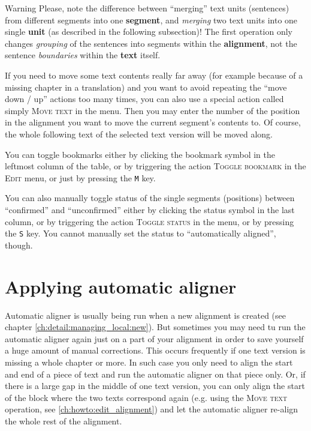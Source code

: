 \documentclass[a4paper,10pt,oneside]{book}
\newcommand{\keys}[1]{\texttt{#1}}
\newcommand{\menu}[1]{\textsc{#1}}
\begin{document}
\begin{bclogo}[couleur = blue!30, arrondi = 0.1, logo = \bcattention,
ombre = true , epOmbre = 0.125, couleurOmbre = black!30, blur, epBord = 0.3, marge = 5]{Warning}\small
Please, note the difference between ``merging'' text units (sentences) from different segments into one \textbf{segment}, and \emph{merging} two text units into one single \textbf{unit} (as described in the following subsection)! The first operation only changes \emph{grouping} of the sentences into segments within the \textbf{alignment}, not the sentence \emph{boundaries} within the \textbf{text} itself.
\end{bclogo}

If you need to move some text contents really far away (for example because of a missing chapter in a translation) and you want to avoid repeating the ``move down / up'' actions too many times, you can also use a special action called simply \menu{Move text} in the menu. Then you may enter the number of the position in the alignment you want to move the current segment's contents to. Of course, the whole following text of the selected text version will be moved along.

You can toggle bookmarks either by clicking the bookmark symbol in the leftmost column of the table, or by triggering the action \menu{Toggle bookmark} in the \menu{Edit} menu, or just by pressing the \keys{M} key.

You can also manually toggle status of the single segments (positions) between ``confirmed'' and ``unconfirmed'' either by clicking the status symbol in the last column, or by triggering the action \menu{Toggle status} in the menu, or by pressing the \keys{S} key. You cannot manually set the status to ``automatically aligned'', though.

\section{Applying automatic aligner}\label{ch:howto:autoalign}

Automatic aligner is usually being run when a new alignment is created (see chapter \ref{ch:detail:managing_local:new}). But sometimes you may need tu run the automatic aligner again just on a part of your alignment in order to save yourself a huge amount of manual corrections. This occurs frequently if one text version is missing a whole chapter or more. In such case you only need to align the start and end of a piece of text and run the automatic aligner on that piece only. Or, if there is a large gap in the middle of one text version, you can only align the start of the block where the two texts correspond again (e.g. using the \menu{Move text} operation, see \ref{ch:howto:edit_alignment}) and let the automatic aligner re-align the whole rest of the alignment.
\end{document}
